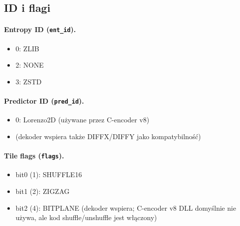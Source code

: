 \documentclass[11pt,a4paper]{article}
\begin{document}
\subsection{ID i flagi}
\paragraph{Entropy ID (\texttt{ent\_id}).}
\begin{itemize}
  \item 0: ZLIB
  \item 2: NONE
  \item 3: ZSTD
\end{itemize}

\paragraph{Predictor ID (\texttt{pred\_id}).}
\begin{itemize}
  \item 0: Lorenzo2D (używane przez C-encoder v8)
  \item (dekoder wspiera także DIFFX/DIFFY jako kompatybilność)
\end{itemize}

\paragraph{Tile flags (\texttt{flags}).}
\begin{itemize}
  \item bit0 (1): SHUFFLE16
  \item bit1 (2): ZIGZAG
  \item bit2 (4): BITPLANE (dekoder wspiera; C-encoder v8 DLL domyślnie nie używa, ale kod shuffle/unshuffle jest włączony)
\end{itemize}
\end{document}
